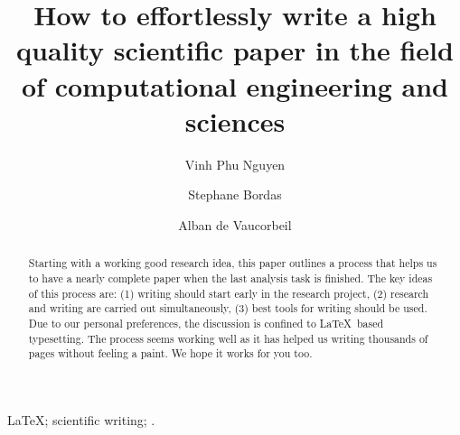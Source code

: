 \documentclass[authoryear,3p,times,preprint,review,fleqn]{elsarticle}
\numberwithin{equation}{section}
\theoremstyle{remark}
\begin{document}

\begin{frontmatter}



\title{\textbf{How to effortlessly write a high quality scientific paper in the field of computational engineering and sciences }}



\author[1]{Vinh Phu Nguyen}
\author[2]{Stephane Bordas}
\author[3]{Alban de Vaucorbeil}


\address[1]{Department of Civil Engineering, Monash University, Clayton 3800, VIC, Australia}
\address[2]{Institute of Computational Engineering, University of Luxembourg, Faculty of Sciences Communication and Technology, Luxembourg}
\address[3]{Institute for Frontier Materials, Deakin University, Geelong, VIC, 3216, Australia}



\begin{abstract}
Starting with a working good research idea, this paper outlines a process that helps us to have a nearly complete paper when the last analysis task is finished.  The key ideas of this process are: (1) writing should start early in the research project, (2) research and writing are carried out simultaneously, (3) best tools for writing should be used.   Due to our personal preferences, the discussion is confined to \LaTeX\ based typesetting. The process seems working well as it has helped us writing thousands of pages without feeling a paint. We hope it works for you too. 

\end{abstract}


\begin{keyword}
 \LaTeX; scientific writing; .
\end{keyword}


\end{frontmatter}
\end{document}
